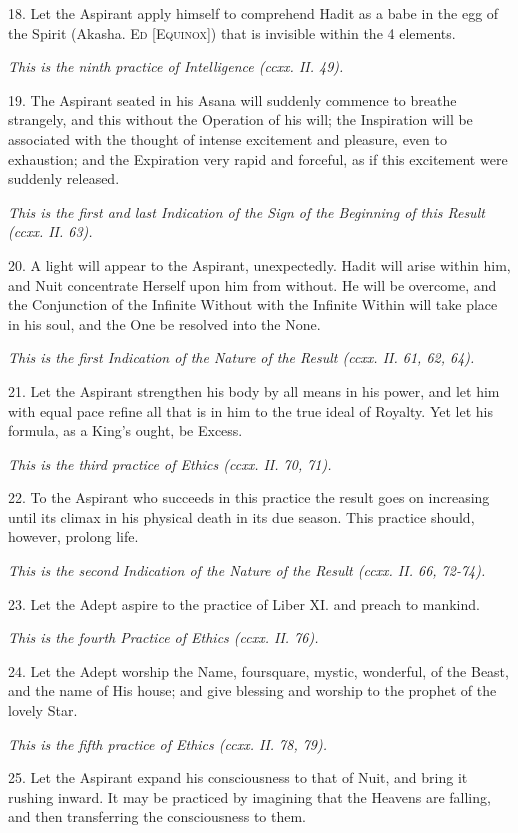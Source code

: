 18. Let the Aspirant apply himself to comprehend Hadit as a babe in the egg of the Spirit (Akasha. \textsc{Ed [Equinox]}) that is invisible within the 4 elements.

\textit{This is the ninth practice of Intelligence (ccxx. II. 49).}

19. The Aspirant seated in his Asana will suddenly commence to breathe strangely, and this without the Operation of his will; the Inspiration will be associated with the thought of intense excitement and pleasure, even to exhaustion; and the Expiration very rapid and forceful, as if this excitement were suddenly released.

\textit{This is the first and last Indication of the Sign of the Beginning of this Result (ccxx. II. 63).}

20. A light will appear to the Aspirant, unexpectedly. Hadit will arise within him, and Nuit concentrate Herself upon him from without. He will be overcome, and the Conjunction of the Infinite Without with the Infinite Within will take place in his soul, and the One be resolved into the None.

\textit{This is the first Indication of the Nature of the Result (ccxx. II. 61, 62, 64).}

21. Let the Aspirant strengthen his body by all means in his power, and let him with equal pace refine all that is in him to the true ideal of Royalty. Yet let his formula, as a King's ought, be Excess.

\textit{This is the third practice of Ethics (ccxx. II. 70, 71).}

22. To the Aspirant who succeeds in this practice the result goes on increasing until its climax in his physical death in its due season. This practice should, however, prolong life.

\textit{This is the second Indication of the Nature of the Result (ccxx. II. 66, 72-74).}

23. Let the Adept aspire to the practice of Liber XI. and preach to mankind.

\textit{This is the fourth Practice of Ethics (ccxx. II. 76).}

24. Let the Adept worship the Name, foursquare, mystic, wonderful, of the Beast, and the name of His house; and give blessing and worship to the prophet of the lovely Star.

\textit{This is the fifth practice of Ethics (ccxx. II. 78, 79).}

25. Let the Aspirant expand his consciousness to that of Nuit, and bring it rushing inward. It may be practiced by imagining that the Heavens are falling, and then transferring the consciousness to them.

